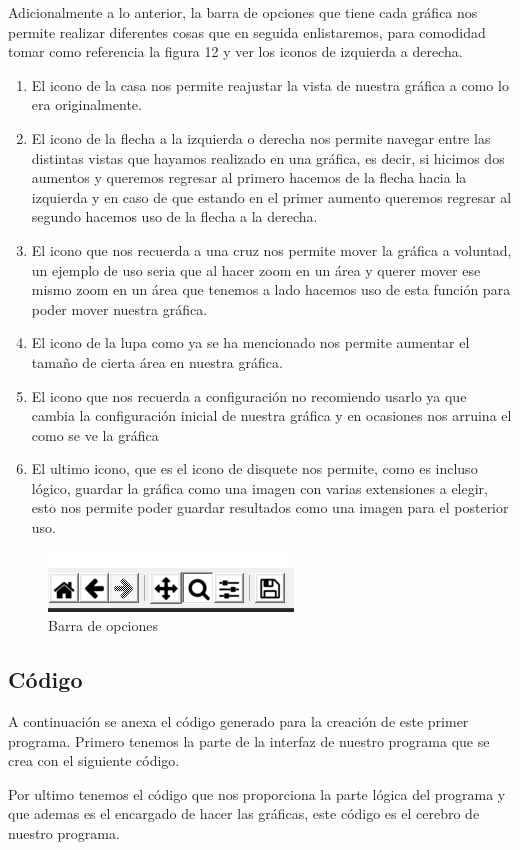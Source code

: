 \documentclass[11pt]{article}
\begin{document}
		Adicionalmente a lo anterior, la barra de opciones que tiene cada gráfica nos permite realizar diferentes cosas que en seguida enlistaremos, para comodidad tomar como referencia la figura 12 y ver los iconos de izquierda a derecha.
		\begin{enumerate}
		  \item El icono de la casa nos permite reajustar la vista de nuestra gráfica a como lo era originalmente.
		  \item El icono de la flecha a la izquierda o derecha nos permite navegar entre las distintas vistas que hayamos realizado en una gráfica, es decir, si hicimos dos aumentos y queremos regresar al primero hacemos de la flecha hacia la izquierda y en caso de que estando en el primer aumento queremos regresar al segundo hacemos uso de la flecha a la derecha.
		  \item El icono que nos recuerda a una cruz nos permite mover la gráfica a voluntad, un ejemplo de uso seria que al hacer zoom en un área y querer mover ese mismo zoom en un área que tenemos a lado hacemos uso de esta función para poder mover nuestra gráfica.
		  \item El icono de la lupa como ya se ha mencionado nos permite aumentar el tamaño de cierta área en nuestra gráfica.
		  \item El icono que nos recuerda a configuración no recomiendo usarlo ya que cambia la configuración inicial de nuestra gráfica y en ocasiones nos arruina el como se ve la gráfica
		  \item El ultimo icono, que es el icono de disquete nos permite, como es incluso lógico, guardar la gráfica como una imagen con varias extensiones a elegir, esto nos permite poder guardar resultados como una imagen para el posterior uso.
		\end{enumerate}
		\begin{figure}[H]
			\centering
			\includegraphics[scale=1]{resources/barra.png}
			\caption{Barra de opciones}\label{fig:picture}
		\end{figure}
		\newpage
		\subsection{Código}
	A continuación se anexa el código generado para la creación de este primer programa. Primero
tenemos la parte de la interfaz de nuestro programa que se crea con el siguiente código.
\par
	Por ultimo tenemos el código que nos proporciona la parte lógica del programa y que ademas es el encargado de hacer las gráficas, este código es el cerebro de nuestro programa.
\end{document}
